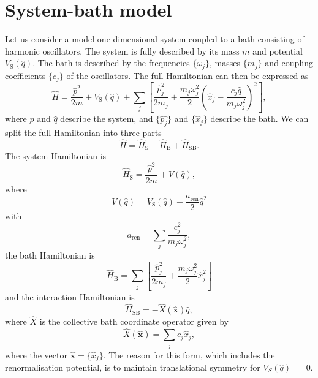 \section{System-bath model}\label{sec:system_bath}
Let us consider a model one-dimensional system coupled to a bath consisting of harmonic oscillators. The system is fully described by its mass $m$ and potential $V_\mathrm{S}(\hat{q})$. The bath is described by the frequencies $\{\omega_j\}$, masses $\{m_j\}$ and coupling coefficients $\{c_j\}$ of the oscillators. The full Hamiltonian can then be expressed as
\begin{equation}
	\hat{H} = \frac{\hat{p}^2}{2m} + V_\mathrm{S}(\hat{q}) + \sum_{j} \left[\frac{\hat{p}_j^2}{2m_j} + \frac{m_j \omega_j^2}{2}\left(\hat{x}_j - \frac{c_j \hat{q}}{m_j \omega_j^2}\right)^2\right],
\end{equation}
where $\hat{p}$ and $\hat{q}$ describe the system, and $\{\hat{p_j}\}$ and $\{\hat{x}_j\}$ describe the bath. We can split the full Hamiltonian into three parts
\begin{equation}
	\hat{H} = \hat{H}_\mathrm{S} + \hat{H}_\mathrm{B} + \hat{H}_\mathrm{SB}.
\end{equation}
The system Hamiltonian is
\begin{equation}
	\hat{H}_\mathrm{S} = \frac{\hat{p}^2}{2m} + V(\hat{q}),
\end{equation}
where
\begin{equation}
V(\hat{q}) = V_\mathrm{S}(\hat{q}) + \frac{a_\mathrm{ren}}{2}\hat{q}^2
\label{eq:renorm_pot}
\end{equation}
with
\begin{equation}
	a_\mathrm{ren} = \sum_j \frac{c_j^2}{m_j \omega_j^2},
\end{equation}
the bath Hamiltonian is
\begin{equation}
	\hat{H}_\mathrm{B} = \sum_{j}\left[ \frac{\hat{p}_j^2}{2m_j} + \frac{m_j \omega_j^2}{2}\hat{x}_j^2 \right]
\end{equation}
and the interaction Hamiltonian is
\begin{equation}
	\hat{H}_\mathrm{SB} = -\hat{X}(\bm{\hat{x}})\hat{q},
\end{equation}
where $\hat{X}$ is the collective bath coordinate operator given by
\begin{equation}
	\hat{X}(\bm{\hat{x}}) = \sum_j c_j \hat{x}_j,
\end{equation}
where the vector $\bm{\hat{x}}= \{\hat{x}_j\}$. The reason for this form, which includes the renormalisation potential, is to maintain translational symmetry for $V_S(\hat{q})~=~0$.\supercite{Caldeira1983b}

